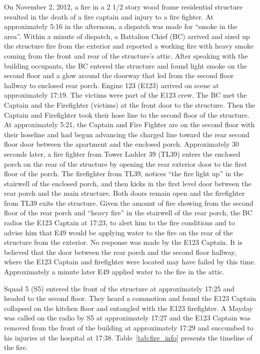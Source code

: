 \documentclass[11pt,oneside]{book}
\begin{document}
On November 2, 2012, a fire in a 2 1/2 story wood frame residential structure resulted in the death of a fire captain and injury to a fire fighter. At approximately 5:16 in the afternoon, a dispatch was made for ``smoke in the area''. Within a minute of dispatch, a Battalion Chief (BC) arrived and sized up the structure fire from the exterior and reported a working fire with heavy smoke coming from the front and rear of the structure's attic. After speaking with the building occupants, the BC entered the structure and found light smoke on the second floor and a glow around the doorway that led from the second floor hallway to enclosed rear porch. Engine 123 (E123) arrived on scene at approximately 17:19. The victims were part of the E123 crew.  The BC met the Captain and the Firefighter (victims) at the front door to the structure.  Then the Captain and Firefighter took their hose line to the second floor of the structure. At approximately 5:21, the Captain and Fire Fighter are on the second floor with their hoseline and had begun advancing the charged line toward the rear second floor door between the apartment and the enclosed porch. Approximately 30 seconds later, a fire fighter from Tower Ladder 39 (TL39) enters the enclosed porch on the rear of the structure by opening the rear exterior door to the first floor of the porch. The firefighter from TL39, notices ``the fire light up'' in the stairwell of the enclosed porch, and then kicks in the first level door between the rear porch and the main structure. Both doors remain open and the firefighter from TL39 exits the structure. Given the amount of fire showing from the second floor of the rear porch and ``heavy fire'' in the stairwell of the rear porch, the BC radios the E123 Captain at 17:23, to alert him to the fire conditions and to advise him that E49 would be applying water to the fire on the rear of the structure from the exterior. No response was made by the E123 Captain. It is believed that the door between the rear porch and the second floor hallway, where the E123 Captain and firefighter were located may have failed by this time.  Approximately a minute later E49 applied water to the fire in the attic.

Squad 5 (S5) entered the front of the structure at approximately 17:25 and headed to the second floor. They heard a commotion and found the E123 Captain collapsed on the kitchen floor and entangled with the E123 firefighter. A Mayday was called on the radio by S5 at approximately  17:27 and the E123 Captain was removed from the front of the building at approximately 17:29 and succumbed to his injuries at the hospital at 17:38. Table~\ref{tab:fire_info} presents the timeline of the fire.
\end{document}
